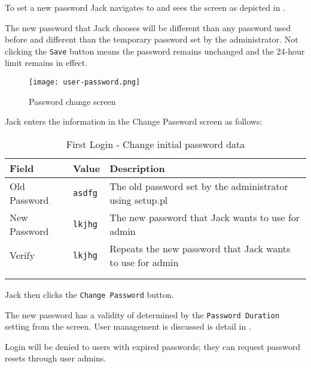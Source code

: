 To set a new password Jack navigates to  and sees the 
screen as depicted in .

The new password that Jack chooses will be different than any password used before and 
different than the temporary password set by the administrator.
Not clicking the \texttt{Save} button means the password remains unchanged and the
24-hour limit remains in effect.

\begin{figure}[H]
\centering
\texttt{[image: user-password.png]}
\caption{Password change screen}
\label{fig:first-user-password}
\end{figure}

Jack enters the information in the Change Password screen as follows:
\begin{longtable}{ llp{6cm} }
        Field & Value & Description \\ \hline
        \endhead
        Old Password & \texttt{asdfg} & The old password set by the administrator using setup.pl\\
        New Password & \texttt{lkjhg} & The new password that Jack wants to use for admin\\
        Verify & \texttt{lkjhg} &  Repeats the new password that Jack wants to use for admin\\
        \\
        \caption{First Login - Change initial password data}
        \label{fig:first-user-change-initial-password}
\end{longtable}


Jack then clicks the \texttt{Change Password} button.

The new password has a validity of determined by the \texttt{Password Duration} setting
from the  screen. User management is discussed is detail in .

Login will be denied to users with expired passwords; they can request
password resets through user admins.

